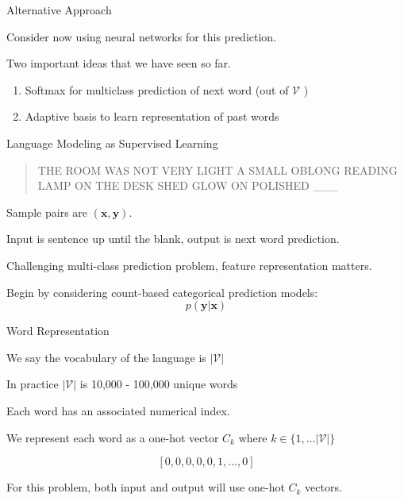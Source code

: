 \documentclass{beamer}
\let\tempone\itemize
\let\temptwo\enditemize
\renewenvironment{itemize}{\tempone\addtolength{\itemsep}{0.5\baselineskip}}{\temptwo}
\newcommand{\air}{\vspace{0.25cm}}
\newcommand{\boldx}{\mathbf{x}}
\newcommand{\boldy}{\mathbf{y}}
\newcommand{\boldx}{\mathbf{x}}
\newcommand{\mcV}{\mathcal{V}}
\begin{document}
\begin{frame}{Alternative Approach}

  Consider now using neural networks for this prediction.
\air

Two important ideas that we have seen so far.

  \begin{enumerate}
  \item Softmax for multiclass prediction of next word (out of $\mcV$ )
  \item  Adaptive basis to learn representation of past words

  \end{enumerate}
\end{frame}


\begin{frame}{Language Modeling as Supervised Learning}
  \begin{quote}
    THE ROOM WAS NOT VERY LIGHT A SMALL OBLONG READING LAMP ON THE
    DESK SHED GLOW ON POLISHED \_\_\_\
  \end{quote}


  \begin{itemize}
  \item Sample pairs are $(\boldx, \boldy)$.

  \item Input is sentence up until the blank, output is next word
    prediction.
  \item Challenging multi-class prediction problem, feature representation matters.
    \pause
  \item Begin by considering count-based categorical prediction models:
    \[ p(\boldy | \boldx) \] 
  \end{itemize}
\end{frame}


\begin{frame}{Word Representation}
  \begin{itemize}
  \item We say the vocabulary of the language is $|\mcV|$ 

  \item In practice $|\mcV|$ is 10,000 - 100,000 unique words      

  \item Each word has an associated numerical index.

  \item We represent each word as a one-hot vector $C_k$ where 
    $k \in \{1, \ldots |\mcV|\}$  

    \[ [0, 0, 0, 0, 0, 1, \ldots, 0 ]\]   
  \item For this problem, both input and output will use one-hot $C_k$ vectors.
  \end{itemize}

\end{frame}
\end{document}
